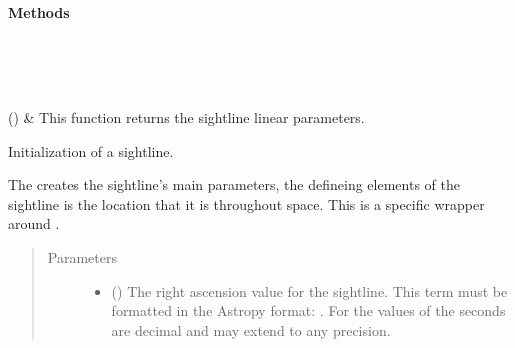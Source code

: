 \documentclass[letterpaper,10pt,english]{sphinxmanual}
\begin{document}
\begin{fulllineitems}
\begin{fulllineitems}
\end{fulllineitems}

\paragraph{Methods}


\begin{savenotes}\sphinxatlongtablestart\begin{longtable}{}
\hline

\endfirsthead

%
{}\\
\hline

\endhead

\hline
{}\\
\endfoot

\endlastfoot

{\hyperref[\detokenize{model_observing:model_observing.Sightline.sightline_parameters}]{}}()
&
This function returns the sightline linear parameters.
\\
\hline
\end{longtable}\sphinxatlongtableend\end{savenotes}

\begin{fulllineitems}
\label{\detokenize{model_observing:model_observing.Sightline.__init__}}
Initialization of a sightline.

The creates the sightline’s main parameters, the defineing elements
of the sightline is the location that it is throughout space. This
is a specific wrapper around .
\begin{quote}\begin{description}
\item[{Parameters}] \leavevmode\begin{itemize}
\item {} 
 () \textendash{} The right ascension value for the sightline. This term must be
formatted in the Astropy  format: .
For the values of the seconds are decimal and may extend to any
precision.


\end{itemize}
\end{description}
\end{quote}
\end{fulllineitems}
\end{fulllineitems}
\end{document}
